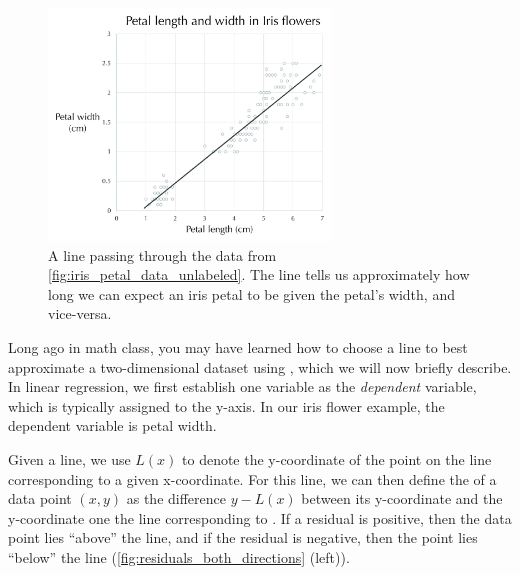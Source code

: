 \begin{figure}[h]
\centering
\mySfFamily
\includegraphics[width = 0.67\textwidth]{../images_CMYK/iris_flowers_regression_line}
\caption{A line passing through the data from \autoref{fig:iris_petal_data_unlabeled}. The line tells us approximately how long we can expect an iris petal to be given the petal's width, and vice-versa.}
\label{fig:iris_flowers_regression_line}
\end{figure}

\begin{qbox}\end{qbox}

Long ago in math class, you may have learned how to choose a line to best approximate a two-dimensional dataset using , which we will now briefly describe. In linear regression, we first establish one variable as the \textit{dependent} variable, which is typically assigned to the y-axis. In our iris flower example, the dependent variable is petal width.

Given a line, we use $L(x)$ to denote the y-coordinate of the point on the line corresponding to a given x-coordinate. For this line, we can then define the  of a data point $(x, y)$ as the difference $y - L(x)$ between its y-coordinate and the y-coordinate one the line corresponding to . If a residual is positive, then the data point lies ``above'' the line, and if the residual is negative, then the point lies ``below'' the line (\autoref{fig:residuals_both_directions} (left)).

